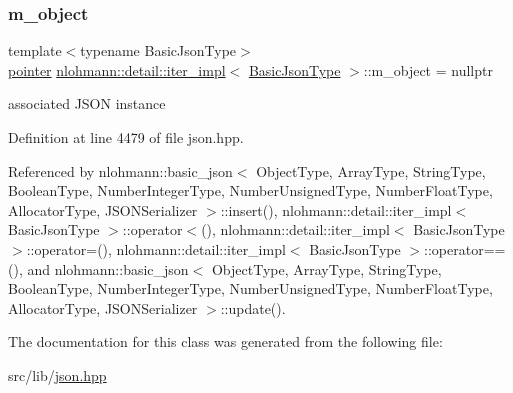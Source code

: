 \mbox{\label{classnlohmann_1_1detail_1_1iter__impl_aca84f84be598bdfaaddd23d928c42bbb}} 
\subsubsection{\texorpdfstring{m\+\_\+object}{m\_object}}
{\footnotesize\ttfamily template$<$typename Basic\+Json\+Type$>$ \\
\hyperlink{classnlohmann_1_1detail_1_1iter__impl_a69e52f890ce8c556fd68ce109e24b360}{pointer} \hyperlink{classnlohmann_1_1detail_1_1iter__impl}{nlohmann\+::detail\+::iter\+\_\+impl}$<$ \hyperlink{classnlohmann_1_1detail_1_1iter__impl_abf18f18793f84b0222aebb5a2a87da7a}{Basic\+Json\+Type} $>$\+::m\+\_\+object = nullptr\hspace{0.3cm}{\ttfamily [private]}}



associated J\+S\+ON instance 



Definition at line 4479 of file json.\+hpp.



Referenced by nlohmann\+::basic\+\_\+json$<$ Object\+Type, Array\+Type, String\+Type, Boolean\+Type, Number\+Integer\+Type, Number\+Unsigned\+Type, Number\+Float\+Type, Allocator\+Type, J\+S\+O\+N\+Serializer $>$\+::insert(), nlohmann\+::detail\+::iter\+\_\+impl$<$ Basic\+Json\+Type $>$\+::operator$<$(), nlohmann\+::detail\+::iter\+\_\+impl$<$ Basic\+Json\+Type $>$\+::operator=(), nlohmann\+::detail\+::iter\+\_\+impl$<$ Basic\+Json\+Type $>$\+::operator==(), and nlohmann\+::basic\+\_\+json$<$ Object\+Type, Array\+Type, String\+Type, Boolean\+Type, Number\+Integer\+Type, Number\+Unsigned\+Type, Number\+Float\+Type, Allocator\+Type, J\+S\+O\+N\+Serializer $>$\+::update().



The documentation for this class was generated from the following file\+:\begin{DoxyCompactItemize}
\item 
src/lib/\hyperlink{json_8hpp}{json.\+hpp}\end{DoxyCompactItemize}
